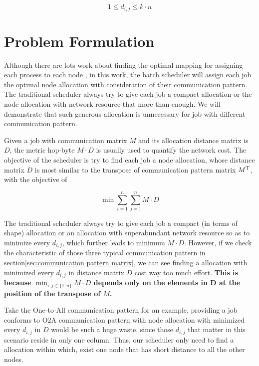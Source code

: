 \documentclass[conference]{IEEEtran}
\begin{document}
\begin{equation}
  1\leq d_{i,j} \leq k\cdot n
\end{equation}




\section{Problem Formulation}
\label{sec:problem formulation}

Although there are lots work about finding the optimal mapping for assigning each process to each node \cite{hpdc14}\cite{jingjin}, in this work, the batch scheduler will assign each job the optimal node allocation with consideration of their communication pattern. The traditional scheduler always try to give each job a compact allocation or the node allocation with network resource that more than enough. We will demonstrate that such generous allocation is unnecessary for job with different communication pattern.

Given a job with communication matrix $M$ and its allocation distance matrix is $D$, the metric hop-byte $M\cdot D$ is usually used to quantify the network cost. The objective of the scheduler is try to find each job a node allocation, whose distance matrix $D$ is most similar to the transpose of communication pattern matrix $M^{\rm T}$, with the objective of

\begin{equation}
\min \sum_{i=1}^{n} \sum_{j=1}^{n} M \cdot D
\end{equation}

The traditional scheduler always try to give each job a compact (in terms of shape) allocation or an allocation with superabundant network resource so as to minimize every $d_{i,j}$, which further leads to minimum $M\cdot D$. However, if we check the characteristic of those three typical communication pattern in section\ref{sec:communication pattern matrix}, we can see finding a allocation with minimized every $d_{i,j}$ in distance matrix $D$ cost way too much effort. \textbf{This is because $\min_{i,j \in \{1,n\}} M \cdot D $ depends only on the elements in D at the position of the transpose of $M$.}

Take the One-to-All communication pattern for an example, providing a job conforms to O2A communication pattern with node allocation with minimized every $d_{i,j}$ in $D$ would be such a huge waste, since those $d_{i,j}$ that matter in this scenario reside in only one column. Thus, our scheduler only need to find a allocation within which, exist one node that has short distance to all the other nodes.
\end{document}
